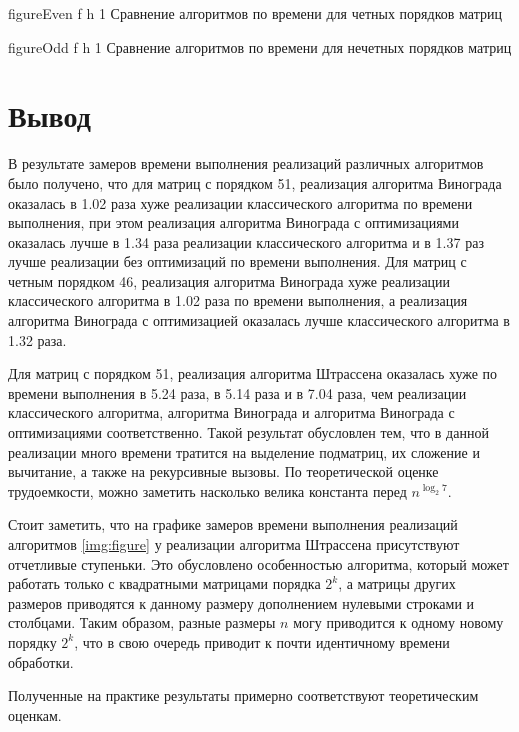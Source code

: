 {figureEven} %
{f} %
{h} %
{1\textwidth} %
{Сравнение алгоритмов по времени для четных порядков матриц} %

{figureOdd} %
{f} %
{h} %
{1\textwidth} %
{Сравнение алгоритмов по времени для нечетных порядков матриц} %


\clearpage

\section*{Вывод}

В результате замеров времени выполнения реализаций различных алгоритмов было получено, что для матриц с порядком 51, реализация алгоритма Винограда оказалась в 1.02 раза хуже реализации классического алгоритма по времени выполнения, при этом реализация алгоритма Винограда с оптимизациями оказалась лучше в 1.34 раза реализации классического алгоритма и в 1.37 раз лучше реализации без оптимизаций по времени выполнения. 
Для матриц с четным порядком 46, реализация алгоритма Винограда хуже реализации классического алгоритма в 1.02 раза по времени выполнения, а реализация алгоритма Винограда с оптимизацией оказалась лучше классического алгоритма в 1.32 раза. 

Для матриц с порядком 51, реализация алгоритма Штрассена оказалась хуже по времени выполнения в 5.24 раза, в 5.14 раза и в 7.04 раза, чем реализации классического алгоритма, алгоритма Винограда и алгоритма Винограда с оптимизациями соответственно. 
Такой результат обусловлен тем, что в данной реализации много времени тратится на выделение подматриц, их сложение и вычитание, а также на рекурсивные вызовы. По теоретической оценке трудоемкости, можно заметить насколько велика константа перед $n^{\log_{2}7}$.

Стоит заметить, что на графике замеров времени выполнения реализаций алгоритмов \ref{img:figure} у реализации алгоритма Штрассена присутствуют отчетливые ступеньки. Это обусловлено особенностью алгоритма, который может работать только с квадратными матрицами порядка $2^k$, а матрицы других размеров приводятся к данному размеру дополнением нулевыми строками и столбцами. Таким образом, разные размеры $n$ могу приводится к одному новому порядку $2^k$, что в свою очередь приводит к почти идентичному времени обработки.

Полученные на практике результаты примерно соответствуют теоретическим оценкам.